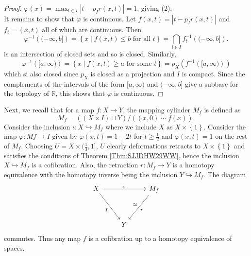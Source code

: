 \documentclass[reqno]{amsart}
\theoremstyle{definition}
\theoremstyle{remark}
\begin{document}
\begin{proof}
    $\varphi (x) = 
    \max_{t \in I} \left| t - p_I r(x,t) \right| = 1$, giving
    (2).\\
    It remains to show that $\varphi $ is continuous.
    Let $f(x,t) = \left| t - p_I r(x,t) \right| $ and
    $f_t = (x,t)$ all of which are continuous.
    Then
    \[
        \varphi^{-1} \left( (- \infty, b] \right) 
        = \left\{ x  \mid f(x,t) \le b \text{ for all }t 
        \right\} = 
        \bigcap_{i \in  I} f_t^{-1}\left( (- \infty, b] \right) .
    \]
    is an intersection of closed sets and so is closed.
    Similarly,
    \[
    \varphi^{-1} \left( [a, \infty) \right) 
    = \left\{ x  \mid  f(x,t) \ge a \text{ for some }t \right\} 
    = p_X \left( f^{-1} \left( [a, \infty) \right)  \right) 
    \] 
    which si also closed since $p_X$ is closed as
    a projection and
    $I$ is compact.
    Since the complements of the intervals of the
    form $[a, \infty)$ and 
    $(-\infty, b]$ give a subbase for the topology of
    $\mathbb{R}$, this shows that
    $\varphi $ is continuous.





\end{proof}


Next, we recall that for a map
$f \colon X \to Y$, the mapping cylinder
$M_f$ is defined as
\[
M_f = \left( \left( X \times I \right) \sqcup Y \right) 
/ \left( \left( x,0 \right) \sim f(x) \right) .
\] 
Consider the inclusion
$\iota \colon X \hookrightarrow 
M_f$ where we include $X$ as
$X \times \left\{ 1 \right\} $.
Consider the map
$ \varphi \colon
M f \to I$ given by
$ \varphi (x,t)  =  1 - 2t$ for
$t \ge \frac{1}{2}$ and
$\varphi (x,t) = 1$ on the rest of $M_f$. Choosing
$U = X \times (\frac{1}{3}, 1]$, $U$ clearly
deformations retracts to $X \times \left\{ 1 \right\} $ and
satisfies the conditions of 
Theorem \ref{Thm:SJJDHW29WW}, hence
the inclusion $X \hookrightarrow M_f$ is a cofibration.
Also, the retraction
$r \colon M_f \to Y$ is a homotopy equivalence
with the homotopy inverse being the inclusion
$Y \hookrightarrow M_f$. The diagram
\begin{equation*}
\begin{tikzcd}
    X \ar[rr, "\iota"] \ar[ddr, "f"'] & & M_f \ar[ddl, "r", "\simeq"']\\ 
                                     &&\\
                                     & Y &
\end{tikzcd}
\end{equation*}
commutes.
Thus any map $f$ is a cofibration up to
a homotopy equivalence of spaces.
\end{document}
